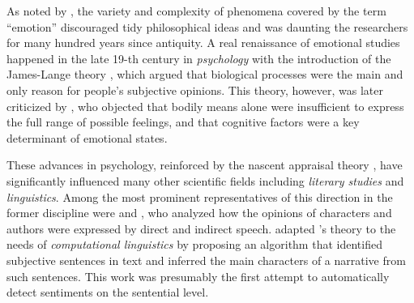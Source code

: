 As noted by \citet{Sousa:14}, the variety and complexity of phenomena
covered by the term ``emotion'' discouraged tidy philosophical ideas
and was daunting the researchers for many hundred years since
antiquity.  A real renaissance of emotional studies happened in the
late 19-th century in \emph{psychology} with the introduction of the
James-Lange theory \cite{James:1884,Lange:1885}, which argued that
biological processes were the main and only reason for people's
subjective opinions.  This theory, however, was later criticized by
\citet{Schachter:62}, who objected that bodily means alone were
insufficient to express the full range of possible feelings, and that
cognitive factors were a key determinant of emotional states.


These advances in psychology, reinforced by the nascent appraisal
theory \citep{Arnold:60}, have significantly influenced many other
scientific fields including \emph{literary studies} and
\emph{linguistics}.  Among the most prominent representatives of this
direction in the former discipline were \citet{Rorty:80} and
\citet{Banfield:82}, who analyzed how the opinions of characters and
authors were expressed by direct and indirect speech.
\citet{Wiebe:90a,Wiebe:94} adapted \citeauthor{Banfield:82}'s theory
to the needs of \emph{computational linguistics} by proposing an
algorithm that identified subjective sentences in text and inferred
the main characters of a narrative from such sentences.  This work was
presumably the first attempt to automatically detect sentiments on the
sentential level.

